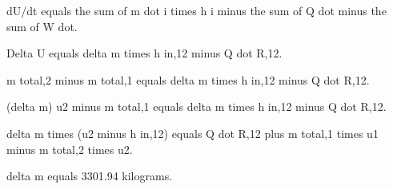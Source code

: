 dU/dt equals the sum of m dot i times h i minus the sum of Q dot minus the sum of W dot.  

Delta U equals delta m times h in,12 minus Q dot R,12.  

m total,2 minus m total,1 equals delta m times h in,12 minus Q dot R,12.  

(delta m) u2 minus m total,1 equals delta m times h in,12 minus Q dot R,12.  

delta m times (u2 minus h in,12) equals Q dot R,12 plus m total,1 times u1 minus m total,2 times u2.  

delta m equals 3301.94 kilograms.